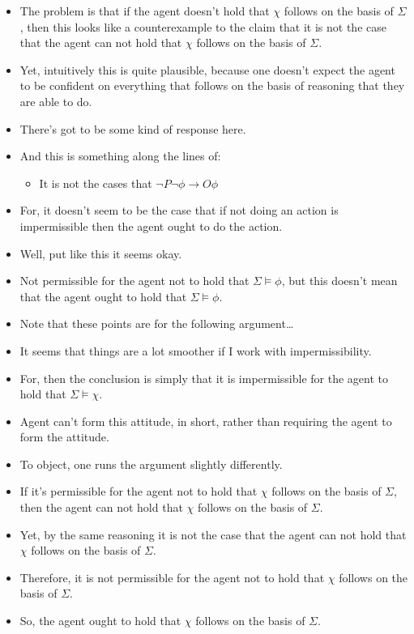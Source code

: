 \documentclass[10pt]{article}
\begin{document}
\begin{itemize}
\item The problem is that if the agent doesn't hold that \(\chi\) follows on the basis of \(\Sigma\), then this looks like a counterexample to the claim that it is not the case that the agent can not hold that \(\chi\) follows on the basis of \(\Sigma\).
\item Yet, intuitively this is quite plausible, because one doesn't expect the agent to be confident on everything that follows on the basis of reasoning that they are able to do.
\end{itemize}

\begin{itemize}
\item There's got to be some kind of response here.
\item And this is something along the lines of:
  \begin{itemize}
  \item It is not the cases that \(\lnot P \lnot\phi \rightarrow O \phi\)
  \end{itemize}
\item For, it doesn't seem to be the case that if not doing an action is impermissible then the agent ought to do the action.
\item Well, put like this it seems okay.
\item Not permissible for the agent not to hold that \(\Sigma \vDash \phi\), but this doesn't mean that the agent ought to hold that \(\Sigma \vDash \phi\).
\item {\color{red} Note that these points are for the following argument\dots}
\item It seems that things are a lot smoother if I work with impermissibility.
\item For, then the conclusion is simply that it is impermissible for the agent to hold that \(\Sigma \vDash \chi\).
\item Agent can't form this attitude, in short, rather than requiring the agent to form the attitude.
\end{itemize}

\begin{itemize}
\item To object, one runs the argument slightly differently.
\item If it's permissible for the agent not to hold that \(\chi\) follows on the basis of \(\Sigma\), then the agent can not hold that \(\chi\) follows on the basis of \(\Sigma\).
\item Yet, by the same reasoning it is not the case that the agent can not hold that \(\chi\) follows on the basis of \(\Sigma\).
\item Therefore, it is not permissible for the agent not to hold that \(\chi\) follows on the basis of \(\Sigma\).
\item So, the agent ought to hold that \(\chi\) follows on the basis of \(\Sigma\).
\end{itemize}
\end{document}
